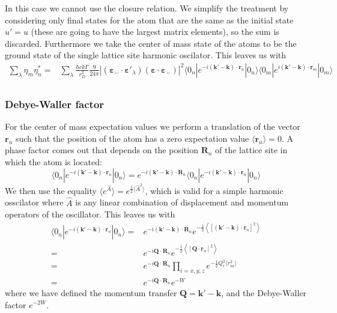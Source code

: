 \documentclass[11pt,letter]{article}
\newcommand{\bv}[1]{\ensuremath{\bm{#1}}}
\begin{document}
In this case we cannot use the closure relation.   We simplify the treatment by
considering only final states for the atom that are the same as the initial
state $u'=u$ (these are going to have the largest matrix elements), so the sum
is discarded.  Furthermore we take the center of mass state of the atoms to be the ground state of the single lattice site harmonic oscilator.  This leaves us with 
\begin{equation}
\begin{split}
 \sum_{\lambda } \eta_{m}\eta_{n}^{*} = & 
 \sum_{\lambda } \frac{\hbar c k \Gamma}{r_{D}^{2}}  
    \frac{9}{24\pi} 
       | (\bv{\varepsilon}_{-}\cdot \bv{\varepsilon}'_{\lambda} )
                       (\bv{\varepsilon}\cdot \bv{\varepsilon}_{-} ) |^{2}
      \langle 0_{n} | e^{-i(\bv{k}'-\bv{k}) \cdot\bv{r}_{n}} | 0_{n}  \rangle
      \langle 0_{m} | e^{i(\bv{k}'-\bv{k}) \cdot\bv{r}_{m}} | 0_{m}  \rangle \\
\end{split}
\end{equation}

\subsubsection{Debye-Waller factor} 

For the center of mass expectation values we perform a translation of the vector $\bv{r}_{n}$ such that the position of the atom has a zero expectation value $\langle \bv{r}_{n} \rangle = 0$.  A phase factor comes out that depends on the position $\bv{R}_{n}$ of the lattice site in which the atom is located: 
\begin{equation}
      \langle 0_{n} | e^{-i(\bv{k}'-\bv{k}) \cdot\bv{r}_{n}} | 0_{n}  \rangle 
    = e^{-i(\bv{k}'-\bv{k}) \cdot\bv{R}_{n}} 
      \langle 0_{n} | e^{-i(\bv{k}'-\bv{k}) \cdot\bv{r}_{n}} | 0_{n}  \rangle
\end{equation} 
We then use the equality $\langle e^{\hat{A}} \rangle = e^{\frac{1}{2} \langle \hat{A}^{2} \rangle }$, 
which is valid for a simple harmonic osscilator where $\hat{A}$ is any linear
combination of displacement and momentum operators of the oscillator.  This leaves us with
\begin{equation}
\begin{split}
      \langle 0_{n} | e^{-i(\bv{k}'-\bv{k}) \cdot\bv{r}_{n}} | 0_{n}  \rangle 
    = & e^{-i(\bv{k}'-\bv{k}) \cdot\bv{R}_{n}} 
      e^{ -\frac{1}{2} \left\langle [ (\bv{k}'-\bv{k}) \cdot\bv{r}_{n} ]^{2} \right\rangle } \\
    = & e^{ -i \bv{Q} \cdot \bv{R}_{n}} 
      e^{ -\frac{1}{2} \left\langle [ \bv{Q} \cdot\bv{r}_{n} ]^{2} \right\rangle } \\ 
    = & e^{ -i \bv{Q} \cdot \bv{R}_{n}}
      \prod_{i=x,y,z} e^{ - \frac{1}{2}Q_{i}^{2}\langle r_{ni} ^{2} \rangle } \\ 
    = & e^{ -i \bv{Q} \cdot \bv{R}_{n}}
      e^{-W} 
\end{split}
\end{equation} 
where we have defined the momentum transfer $\bv{Q} = \bv{k}' - \bv{k}$,  and the Debye-Waller factor $e^{-2W}$. 
\end{document}
